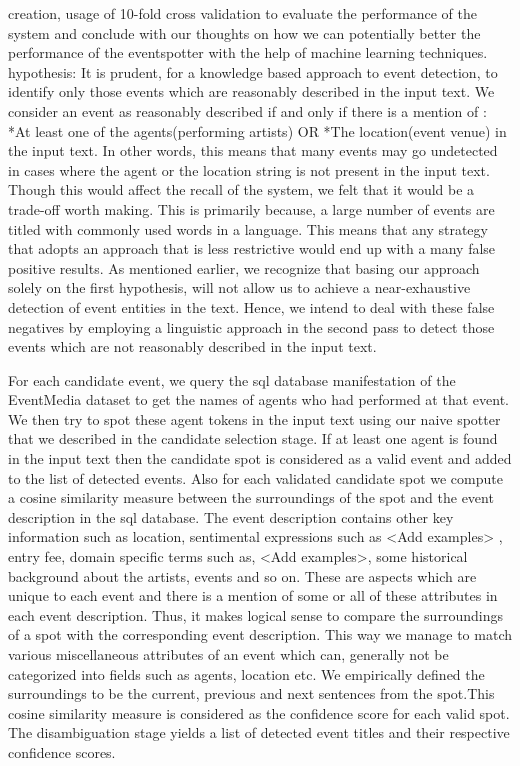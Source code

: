 \documentclass[a4paper,11pt]{report}
\begin{document}
creation, usage of 10-fold cross validation to evaluate the performance of the system and conclude with our thoughts on how we can potentially better the performance of the eventspotter with the help of machine learning techniques. hypothesis: It is prudent, for a knowledge based approach to event detection, to identify only those events which are reasonably described in the input text. We consider an event as reasonably described if and only if there is a mention of :
*At least one of the agents(performing artists)  OR *The location(event venue) in the input text. In other words, this means that many events may go undetected in cases where the agent or the location string is not present in the input text. Though this would affect the recall of the system, we felt that it would be a trade-off worth making. This is primarily because, a large number of events are titled with commonly used words in a language. This means that any strategy that adopts an approach that is less restrictive would end up with a many false positive results. As mentioned earlier, we recognize that basing our approach solely on the first hypothesis, will not allow us to achieve a near-exhaustive detection of event entities in the text. Hence, we intend to deal with these false negatives by employing a linguistic approach in the second pass to detect those events which are not reasonably described in the input text.

For each candidate event, we query the sql database manifestation of the EventMedia dataset to get the names of agents who had performed at that event. We then try to spot these  agent tokens in the input text using our naive spotter that we described in the candidate selection stage. If at least one agent is found in the input text then the candidate spot is considered as a valid event and added to the list of detected events. Also for each validated candidate spot we compute a cosine similarity measure between the surroundings of the spot and the event description in the sql database. The event description contains other key information such as location, sentimental expressions such as <Add examples> , entry fee, domain specific terms such as, <Add examples>, some historical background about the artists, events and so on. These are aspects which are unique to each event and there is a mention of some or all of these attributes in each event description. Thus, it makes logical sense to compare the surroundings of a spot with the corresponding event description. This way we manage to match various miscellaneous attributes of an event which can, generally not be categorized into fields such as agents, location etc. We empirically defined the surroundings to be the current, previous and next sentences from the spot.This cosine similarity measure is considered as the confidence score for each valid spot. The disambiguation stage yields a list of detected event titles and their respective confidence scores.
\end{document}
